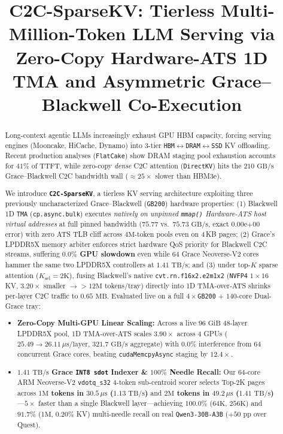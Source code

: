 \documentclass[conference,10pt]{IEEEtran}
\title{C2C-SparseKV: Tierless Multi-Million-Token LLM Serving via Zero-Copy Hardware-ATS 1D TMA and Asymmetric Grace--Blackwell Co-Execution}
\author{\IEEEauthorblockN{Rishi Vinodkumar}}
\begin{document}
\maketitle

\begin{abstract}
Long-context agentic LLMs increasingly exhaust GPU HBM capacity, forcing serving engines (Mooncake, HiCache, Dynamo) into 3-tier \texttt{HBM}$\leftrightarrow$\texttt{DRAM}$\leftrightarrow$\texttt{SSD} KV offloading. Recent production analyses (\texttt{FlatCake}) show DRAM staging pool exhaustion accounts for $41\%$ of TTFT, while zero-copy \emph{dense} C2C attention (\texttt{DirectKV}) hits the $210\text{ GB/s}$ Grace--Blackwell C2C bandwidth wall ($\approx 25\times$ slower than HBM3e).

We introduce \textbf{\texttt{C2C-SparseKV}}, a tierless KV serving architecture exploiting three previously uncharacterized Grace--Blackwell (\texttt{GB200}) hardware properties: (1) Blackwell 1D \texttt{TMA} (\texttt{cp.async.bulk}) executes \emph{natively on unpinned \texttt{mmap()} Hardware-ATS host virtual addresses} at full pinned bandwidth ($75.77$ vs.\ $75.73\text{ GB/s}$, exact $0.00\text{e+00}$ error) with zero ATS TLB cliff across $4\text{M}$-token pools even on 4\,KB pages; (2) Grace's LPDDR5X memory arbiter enforces strict hardware QoS priority for Blackwell C2C streams, suffering \textbf{$0.0\%$ GPU slowdown} even while $64$ Grace Neoverse-V2 cores hammer the same two LPDDR5X controllers at \textbf{$1.41\text{ TB/s}$}; and (3) under top-$K$ sparse attention ($K_{\text{sel}}{=}2\text{K}$), fusing Blackwell's native \texttt{cvt.rn.f16x2.e2m1x2} (\texttt{NVFP4} $1{\times}16$ KV, $3.20\times$ smaller $\to >12\text{M}$ tokens/tray) directly into 1D TMA-over-ATS shrinks per-layer C2C traffic to $0.65\text{ MB}$. Evaluated live on a full $4\times$\texttt{GB200} + $140$-core Dual-Grace tray:
\begin{itemize}
    \item \textbf{Zero-Copy Multi-GPU Linear Scaling:} Across a live $96\text{ GiB}$ 48-layer LPDDR5X pool, 1D TMA-over-ATS scales $3.90\times$ across 4 GPUs ($25.49 \to 26.11\,\mu\text{s/layer}$, \textbf{$321.7\text{ GB/s}$} aggregate) with $0.0\%$ interference from $64$ concurrent Grace cores, beating \texttt{cudaMemcpyAsync} staging by \textbf{$12.4\times$}.
    \item \textbf{$1.41\text{ TB/s}$ Grace \texttt{INT8 sdot} Indexer \& $100\%$ Needle Recall:} Our 64-core ARM Neoverse-V2 \texttt{vdotq\_s32} 4-token sub-centroid scorer selects Top-2K pages across \textbf{$1\text{M}$ tokens in $30.5\,\mu\text{s}$ ($1.13\text{ TB/s}$)} and \textbf{$2\text{M}$ tokens in $49.2\,\mu\text{s}$ ($1.41\text{ TB/s}$)}---$5\times$ faster than a single Blackwell layer---achieving \textbf{$100.0\%$} ($64\text{K}$, $256\text{K}$) and \textbf{$91.7\%$} ($1\text{M}$, $0.20\%$ KV) multi-needle recall on real \texttt{Qwen3-30B-A3B} ($+50\text{ pp}$ over Quest).

\end{itemize}
\end{abstract}
\end{document}
